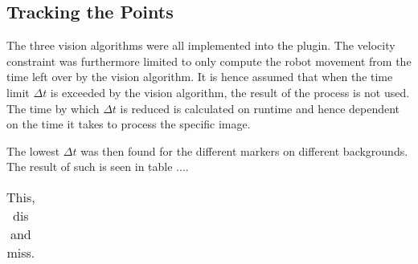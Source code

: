 \subsection{Tracking the Points}
The three vision algorithms were all implemented into the plugin.
The velocity constraint was furthermore limited to only compute the robot movement from the time left over by the vision algorithm.
It is hence assumed that when the time limit $\Delta t$ is exceeded by the vision algorithm, the result of the process is not used.
The time by which $\Delta t$ is reduced is calculated on runtime and hence dependent on the time it takes to process the specific image.

The lowest $\Delta t$ was then found for the different markers on different backgrounds.
The result of such is seen in table ....


\begin{table}
\begin{tabular}{|c|c|c|c|}

\end{tabular}
\caption{This, dis and miss.}
\end{table}



